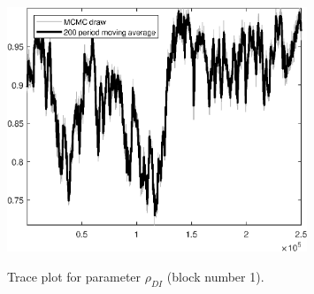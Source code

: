 \begin{figure}[H]
\centering
  \includegraphics[width=0.8\textwidth]{BRS_aggregate/graphs/TracePlot_rho_DI_blck_1}\\
    \caption{Trace plot for parameter ${\rho_{DI}}$ (block number 1).}
\end{figure}
